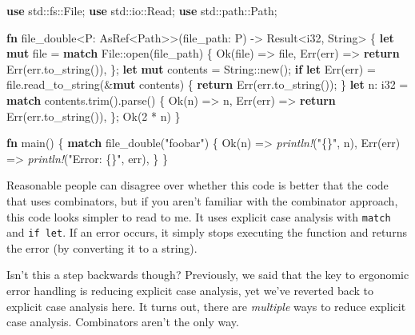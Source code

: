 \documentclass[a4paper,]{book}
\newenvironment{Shaded}{\begin{snugshade}}{\end{snugshade}}
\newcommand{\KeywordTok}[1]{\textcolor[rgb]{0.13,0.29,0.53}{\textbf{{#1}}}}
\newcommand{\DataTypeTok}[1]{\textcolor[rgb]{0.13,0.29,0.53}{{#1}}}
\newcommand{\DecValTok}[1]{\textcolor[rgb]{0.00,0.00,0.81}{{#1}}}
\newcommand{\ConstantTok}[1]{\textcolor[rgb]{0.00,0.00,0.00}{{#1}}}
\newcommand{\StringTok}[1]{\textcolor[rgb]{0.31,0.60,0.02}{{#1}}}
\newcommand{\PreprocessorTok}[1]{\textcolor[rgb]{0.56,0.35,0.01}{\textit{{#1}}}}
\newcommand{\NormalTok}[1]{{#1}}
\begin{document}
\begin{Shaded}
\begin{Highlighting}[]
\KeywordTok{use} \NormalTok{std::fs::File;}
\KeywordTok{use} \NormalTok{std::io::Read;}
\KeywordTok{use} \NormalTok{std::path::Path;}

\KeywordTok{fn} \NormalTok{file_double<P: AsRef<Path>>(file_path: P) -> }\DataTypeTok{Result}\NormalTok{<}\DataTypeTok{i32}\NormalTok{, }\DataTypeTok{String}\NormalTok{> \{}
    \KeywordTok{let} \KeywordTok{mut} \NormalTok{file = }\KeywordTok{match} \NormalTok{File::open(file_path) \{}
        \ConstantTok{Ok}\NormalTok{(file) => file,}
        \ConstantTok{Err}\NormalTok{(err) => }\KeywordTok{return} \ConstantTok{Err}\NormalTok{(err.to_string()),}
    \NormalTok{\};}
    \KeywordTok{let} \KeywordTok{mut} \NormalTok{contents = }\DataTypeTok{String}\NormalTok{::new();}
    \KeywordTok{if} \KeywordTok{let} \ConstantTok{Err}\NormalTok{(err) = file.read_to_string(&}\KeywordTok{mut} \NormalTok{contents) \{}
        \KeywordTok{return} \ConstantTok{Err}\NormalTok{(err.to_string());}
    \NormalTok{\}}
    \KeywordTok{let} \NormalTok{n: }\DataTypeTok{i32} \NormalTok{= }\KeywordTok{match} \NormalTok{contents.trim().parse() \{}
        \ConstantTok{Ok}\NormalTok{(n) => n,}
        \ConstantTok{Err}\NormalTok{(err) => }\KeywordTok{return} \ConstantTok{Err}\NormalTok{(err.to_string()),}
    \NormalTok{\};}
    \ConstantTok{Ok}\NormalTok{(}\DecValTok{2} \NormalTok{* n)}
\NormalTok{\}}

\KeywordTok{fn} \NormalTok{main() \{}
    \KeywordTok{match} \NormalTok{file_double(}\StringTok{"foobar"}\NormalTok{) \{}
        \ConstantTok{Ok}\NormalTok{(n) => }\PreprocessorTok{println!}\NormalTok{(}\StringTok{"\{\}"}\NormalTok{, n),}
        \ConstantTok{Err}\NormalTok{(err) => }\PreprocessorTok{println!}\NormalTok{(}\StringTok{"Error: \{\}"}\NormalTok{, err),}
    \NormalTok{\}}
\NormalTok{\}}
\end{Highlighting}
\end{Shaded}

Reasonable people can disagree over whether this code is better that the
code that uses combinators, but if you aren't familiar with the
combinator approach, this code looks simpler to read to me. It uses
explicit case analysis with \texttt{match} and \texttt{if\ let}. If an
error occurs, it simply stops executing the function and returns the
error (by converting it to a string).

Isn't this a step backwards though? Previously, we said that the key to
ergonomic error handling is reducing explicit case analysis, yet we've
reverted back to explicit case analysis here. It turns out, there are
\emph{multiple} ways to reduce explicit case analysis. Combinators
aren't the only way.
\end{document}
